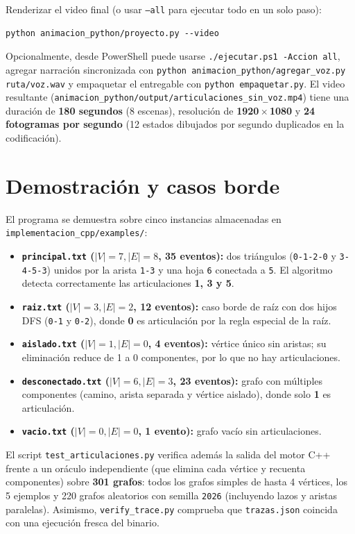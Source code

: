 \documentclass[11pt,a4paper]{article}
\begin{document}
Renderizar el video final (o usar \texttt{--all} para ejecutar todo en un solo paso):
\begin{verbatim}
python animacion_python/proyecto.py --video
\end{verbatim}

Opcionalmente, desde PowerShell puede usarse \texttt{./ejecutar.ps1 -Accion all},
agregar narración sincronizada con \texttt{python animacion\_python/agregar\_voz.py
ruta/voz.wav} y empaquetar el entregable con \texttt{python empaquetar.py}. El
video resultante (\texttt{animacion\_python/output/articulaciones\_sin\_voz.mp4})
tiene una duración de \textbf{180 segundos} (8 escenas), resolución de
\textbf{1920\,$\times$\,1080} y \textbf{24 fotogramas por segundo} (12 estados
dibujados por segundo duplicados en la codificación).

\section{Demostración y casos borde}
El programa se demuestra sobre cinco instancias almacenadas en
\texttt{implementacion\_cpp/examples/}:
\begin{itemize}
  \item \textbf{\texttt{principal.txt} ($|V|=7, |E|=8$, 35 eventos):} dos
    triángulos (\texttt{0-1-2-0} y \texttt{3-4-5-3}) unidos por la arista
    \texttt{1-3} y una hoja \texttt{6} conectada a \texttt{5}. El algoritmo
    detecta correctamente las articulaciones \textbf{1, 3 y 5}.
  \item \textbf{\texttt{raiz.txt} ($|V|=3, |E|=2$, 12 eventos):} caso borde de
    raíz con dos hijos DFS (\texttt{0-1} y \texttt{0-2}), donde \textbf{0} es
    articulación por la regla especial de la raíz.
  \item \textbf{\texttt{aislado.txt} ($|V|=1, |E|=0$, 4 eventos):} vértice
    único sin aristas; su eliminación reduce de 1 a 0 componentes, por lo que
    no hay articulaciones.
  \item \textbf{\texttt{desconectado.txt} ($|V|=6, |E|=3$, 23 eventos):} grafo
    con múltiples componentes (camino, arista separada y vértice aislado),
    donde solo \textbf{1} es articulación.
  \item \textbf{\texttt{vacio.txt} ($|V|=0, |E|=0$, 1 evento):} grafo vacío
    sin articulaciones.
\end{itemize}

El script \texttt{test\_articulaciones.py} verifica además la salida del motor
C++ frente a un oráculo independiente (que elimina cada vértice y recuenta
componentes) sobre \textbf{301 grafos}: todos los grafos simples de hasta 4
vértices, los 5 ejemplos y 220 grafos aleatorios con semilla \texttt{2026}
(incluyendo lazos y aristas paralelas). Asimismo, \texttt{verify\_trace.py}
comprueba que \texttt{trazas.json} coincida con una ejecución fresca del binario.
\end{document}
